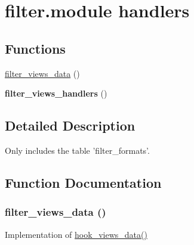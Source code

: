 \hypertarget{group__views__filter__module}{
\section{filter.module handlers}
\label{group__views__filter__module}
}
\subsection*{Functions}
\begin{CompactItemize}
\item 
\hyperlink{group__views__filter__module_g7cff84d71c43da31b5941bcc92d7bdac}{filter\_\-views\_\-data} ()
\item 
\hypertarget{group__views__filter__module_g5f7b3f041c39ab43ff7bf8044fbd2455}{
\textbf{filter\_\-views\_\-handlers} ()}
\label{group__views__filter__module_g5f7b3f041c39ab43ff7bf8044fbd2455}

\end{CompactItemize}


\subsection{Detailed Description}
Only includes the table 'filter\_\-formats'. 

\subsection{Function Documentation}
\hypertarget{group__views__filter__module_g7cff84d71c43da31b5941bcc92d7bdac}{
\subsubsection[{filter\_\-views\_\-data}]{\setlength{\rightskip}{0pt plus 5cm}filter\_\-views\_\-data ()}}
\label{group__views__filter__module_g7cff84d71c43da31b5941bcc92d7bdac}


Implementation of \hyperlink{group__views__hooks_g227057901681e4a33e33c199c7a8c989}{hook\_\-views\_\-data()} 